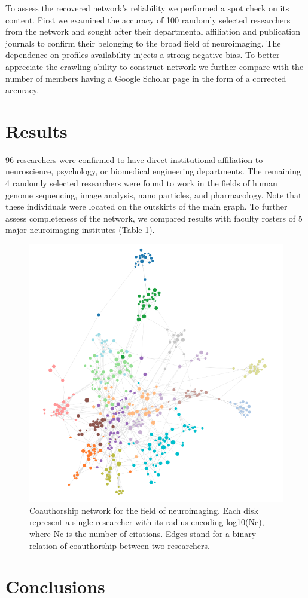 \documentclass[twocolumn]{bmcart}%
\begin{document}
To assess the recovered network's reliability we performed a spot check
on its content. First we examined the accuracy of 100 randomly selected
researchers from the network and sought after their departmental
affiliation and publication journals to confirm their belonging to the
broad field of neuroimaging. The dependence on profiles availability
injects a strong negative bias. To better appreciate the crawling
ability to construct network we further compare with the number of
members having a Google Scholar page in the form of a corrected
accuracy.

\section{Results}\label{results}

96 researchers were confirmed to have direct institutional affiliation
to neuroscience, psychology, or biomedical engineering departments. The
remaining 4 randomly selected researchers were found to work in the
fields of human genome sequencing, image analysis, nano particles, and
pharmacology. Note that these individuals were located on the outskirts
of the main graph. To further assess completeness of the network, we
compared results with faculty rosters of 5 major neuroimaging institutes
(Table 1).

\begin{figure}[h!]
  \includegraphics[width=.47\textwidth]{neuroimaging-500}
  \caption{\label{centfig}
  Coauthorship network for the field of neuroimaging. Each disk represent a single researcher with its radius encoding log10(Nc), where Nc is the number of citations. Edges stand for a binary relation of coauthorship between two researchers.}
\end{figure}

\section{Conclusions}\label{conclusions}
\end{document}
